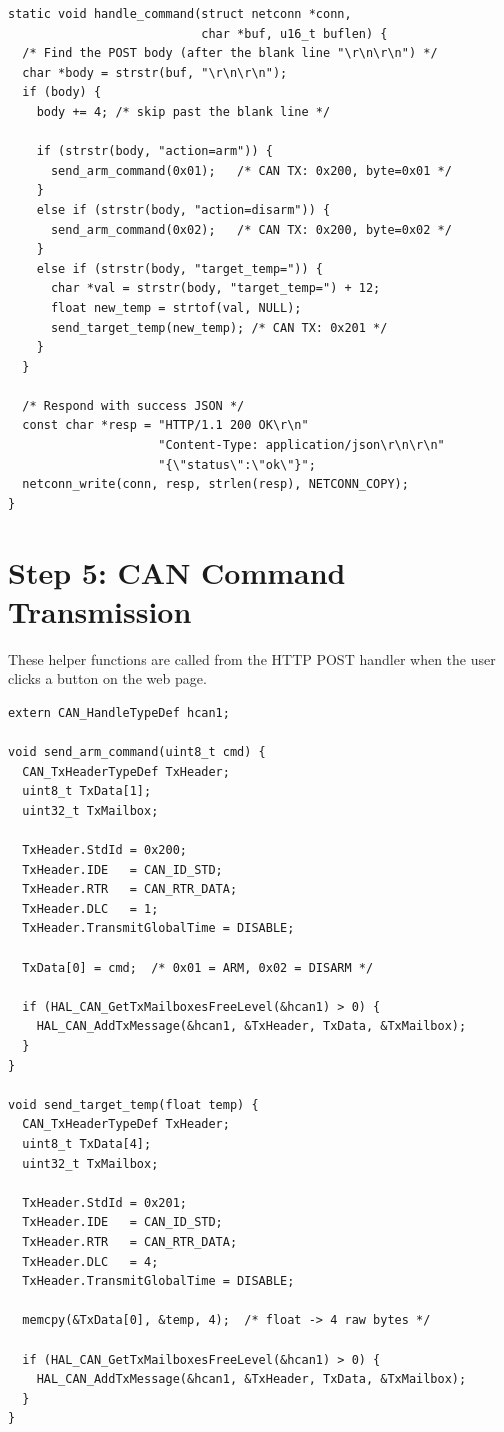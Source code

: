 \documentclass[11pt,a4paper]{article}
\begin{document}
\begin{lstlisting}
static void handle_command(struct netconn *conn,
                           char *buf, u16_t buflen) {
  /* Find the POST body (after the blank line "\r\n\r\n") */
  char *body = strstr(buf, "\r\n\r\n");
  if (body) {
    body += 4; /* skip past the blank line */

    if (strstr(body, "action=arm")) {
      send_arm_command(0x01);   /* CAN TX: 0x200, byte=0x01 */
    }
    else if (strstr(body, "action=disarm")) {
      send_arm_command(0x02);   /* CAN TX: 0x200, byte=0x02 */
    }
    else if (strstr(body, "target_temp=")) {
      char *val = strstr(body, "target_temp=") + 12;
      float new_temp = strtof(val, NULL);
      send_target_temp(new_temp); /* CAN TX: 0x201 */
    }
  }

  /* Respond with success JSON */
  const char *resp = "HTTP/1.1 200 OK\r\n"
                     "Content-Type: application/json\r\n\r\n"
                     "{\"status\":\"ok\"}";
  netconn_write(conn, resp, strlen(resp), NETCONN_COPY);
}
\end{lstlisting}

\newpage

\section{Step 5: CAN Command Transmission}

These helper functions are called from the HTTP POST handler when the user clicks a button on the web page.

\begin{lstlisting}
extern CAN_HandleTypeDef hcan1;

void send_arm_command(uint8_t cmd) {
  CAN_TxHeaderTypeDef TxHeader;
  uint8_t TxData[1];
  uint32_t TxMailbox;

  TxHeader.StdId = 0x200;
  TxHeader.IDE   = CAN_ID_STD;
  TxHeader.RTR   = CAN_RTR_DATA;
  TxHeader.DLC   = 1;
  TxHeader.TransmitGlobalTime = DISABLE;

  TxData[0] = cmd;  /* 0x01 = ARM, 0x02 = DISARM */

  if (HAL_CAN_GetTxMailboxesFreeLevel(&hcan1) > 0) {
    HAL_CAN_AddTxMessage(&hcan1, &TxHeader, TxData, &TxMailbox);
  }
}

void send_target_temp(float temp) {
  CAN_TxHeaderTypeDef TxHeader;
  uint8_t TxData[4];
  uint32_t TxMailbox;

  TxHeader.StdId = 0x201;
  TxHeader.IDE   = CAN_ID_STD;
  TxHeader.RTR   = CAN_RTR_DATA;
  TxHeader.DLC   = 4;
  TxHeader.TransmitGlobalTime = DISABLE;

  memcpy(&TxData[0], &temp, 4);  /* float -> 4 raw bytes */

  if (HAL_CAN_GetTxMailboxesFreeLevel(&hcan1) > 0) {
    HAL_CAN_AddTxMessage(&hcan1, &TxHeader, TxData, &TxMailbox);
  }
}
\end{lstlisting}
\end{document}
